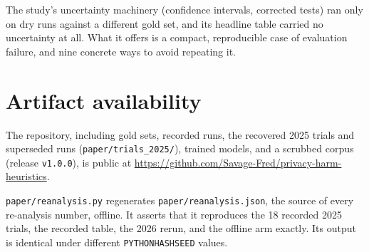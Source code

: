 \documentclass[10pt,twocolumn]{article}
\newif\ifanon
\begin{document}
The study's uncertainty machinery (confidence intervals, corrected tests) ran
only on dry runs against a different gold set, and its headline table carried
no uncertainty at all. What it offers is a compact, reproducible case of
evaluation failure, and nine concrete ways to avoid repeating it.

\section*{Artifact availability}
\label{sec:artifact}
\ifanon
The repository and the recovered trial files will be released on publication.
\else
The repository, including gold sets, recorded runs, the recovered 2025 trials
and superseded runs (\texttt{paper/trials\_2025/}), trained models, and a scrubbed corpus (release
\texttt{v1.0.0}), is public at
\url{https://github.com/Savage-Fred/privacy-harm-heuristics}.
\fi
\texttt{paper/reanalysis.py} regenerates \texttt{paper/reanalysis.json}, the
source of every re-analysis number, offline. It asserts that it reproduces the
18 recorded 2025 trials, the recorded table, the 2026 rerun, and the offline
arm exactly. Its output is identical under different \texttt{PYTHONHASHSEED}
values.
\end{document}
